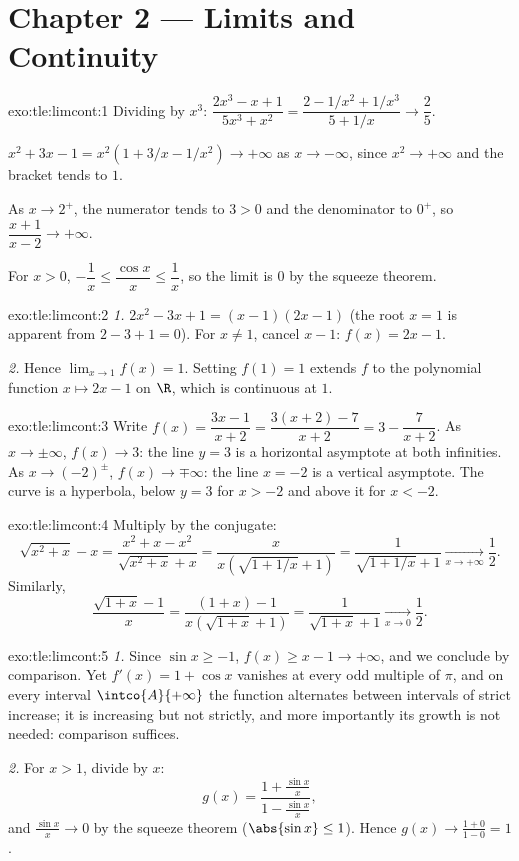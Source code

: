 \section*{Chapter 2 --- Limits and Continuity}

\begin{solution}{exo:tle:limcont:1}
Dividing by $x^3$:
$\dfrac{2x^3 - x + 1}{5x^3 + x^2} = \dfrac{2 - 1/x^2 + 1/x^3}{5 + 1/x}
\to \dfrac{2}{5}$.

$x^2 + 3x - 1 = x^2(1 + 3/x - 1/x^2) \to +\infty$ as $x \to -\infty$, since
$x^2 \to +\infty$ and the bracket tends to $1$.

As $x \to 2^+$, the numerator tends to $3 > 0$ and the denominator to $0^+$,
so $\dfrac{x+1}{x-2} \to +\infty$.

For $x > 0$, $-\dfrac1x \leq \dfrac{\cos x}{x} \leq \dfrac1x$, so the limit
is $0$ by the squeeze theorem.
\end{solution}

\begin{solution}{exo:tle:limcont:2}
\emph{1.} $2x^2 - 3x + 1 = (x-1)(2x-1)$ (the root $x=1$ is apparent from
$2 - 3 + 1 = 0$). For $x \neq 1$, cancel $x - 1$: $f(x) = 2x - 1$.

\emph{2.} Hence $\lim_{x\to1} f(x) = 1$. Setting $f(1) = 1$ extends $f$ to
the polynomial function $x \mapsto 2x-1$ on $\R$, which is continuous at $1$.
\end{solution}

\begin{solution}{exo:tle:limcont:3}
Write $f(x) = \dfrac{3x - 1}{x + 2} = \dfrac{3(x+2) - 7}{x+2}
= 3 - \dfrac{7}{x+2}$. As $x \to \pm\infty$, $f(x) \to 3$: the line $y = 3$
is a horizontal asymptote at both infinities. As $x \to (-2)^\pm$,
$f(x) \to \mp\infty$: the line $x = -2$ is a vertical asymptote. The curve is
a hyperbola, below $y=3$ for $x > -2$ and above it for $x < -2$.
\end{solution}

\begin{solution}{exo:tle:limcont:4}
Multiply by the conjugate:
\[
\sqrt{x^2 + x} - x = \frac{x^2 + x - x^2}{\sqrt{x^2+x} + x}
= \frac{x}{x\left(\sqrt{1 + 1/x} + 1\right)}
= \frac{1}{\sqrt{1 + 1/x} + 1}
\xrightarrow[x\to+\infty]{} \frac{1}{2}.
\]
Similarly,
\[
\frac{\sqrt{1+x} - 1}{x} = \frac{(1+x) - 1}{x\left(\sqrt{1+x} + 1\right)}
= \frac{1}{\sqrt{1+x} + 1} \xrightarrow[x\to0]{} \frac{1}{2}.
\]
\end{solution}

\begin{solution}{exo:tle:limcont:5}
\emph{1.} Since $\sin x \geq -1$, $f(x) \geq x - 1 \to +\infty$, and we
conclude by comparison. Yet $f'(x) = 1 + \cos x$ vanishes at every odd
multiple of $\pi$, and on every interval $\intco{A}{+\infty}$ the function
alternates between intervals of strict increase; it is increasing but not
strictly, and more importantly its growth is not needed: comparison suffices.

\emph{2.} For $x > 1$, divide by $x$:
\[
g(x) = \frac{1 + \frac{\sin x}{x}}{1 - \frac{\sin x}{x}},
\]
and $\frac{\sin x}{x} \to 0$ by the squeeze theorem
($\abs{\sin x} \leq 1$). Hence $g(x) \to \frac{1+0}{1-0} = 1$.
\end{solution}

